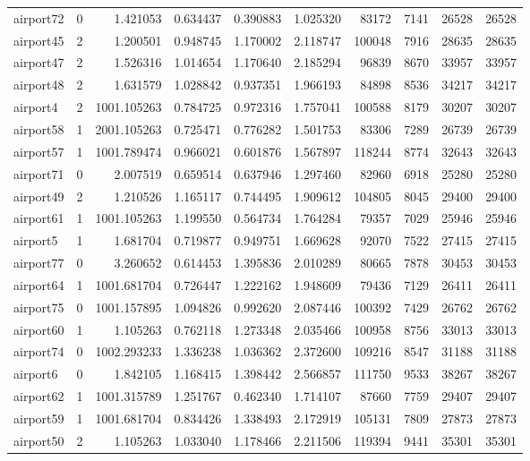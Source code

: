 \begin{longtable}{|l|r|r|r|r|r|r|r|r|r|}
airport72 & 0 & 1.421053 & 0.634437 & 0.390883 & 1.025320 & 83172 & 7141 & 26528 & 26528 \\
airport45 & 2 & 1.200501 & 0.948745 & 1.170002 & 2.118747 & 100048 & 7916 & 28635 & 28635 \\
airport47 & 2 & 1.526316 & 1.014654 & 1.170640 & 2.185294 & 96839 & 8670 & 33957 & 33957 \\
airport48 & 2 & 1.631579 & 1.028842 & 0.937351 & 1.966193 & 84898 & 8536 & 34217 & 34217 \\
airport4 & 2 & 1001.105263 & 0.784725 & 0.972316 & 1.757041 & 100588 & 8179 & 30207 & 30207 \\
airport58 & 1 & 2001.105263 & 0.725471 & 0.776282 & 1.501753 & 83306 & 7289 & 26739 & 26739 \\
airport57 & 1 & 1001.789474 & 0.966021 & 0.601876 & 1.567897 & 118244 & 8774 & 32643 & 32643 \\
airport71 & 0 & 2.007519 & 0.659514 & 0.637946 & 1.297460 & 82960 & 6918 & 25280 & 25280 \\
airport49 & 2 & 1.210526 & 1.165117 & 0.744495 & 1.909612 & 104805 & 8045 & 29400 & 29400 \\
airport61 & 1 & 1001.105263 & 1.199550 & 0.564734 & 1.764284 & 79357 & 7029 & 25946 & 25946 \\
airport5 & 1 & 1.681704 & 0.719877 & 0.949751 & 1.669628 & 92070 & 7522 & 27415 & 27415 \\
airport77 & 0 & 3.260652 & 0.614453 & 1.395836 & 2.010289 & 80665 & 7878 & 30453 & 30453 \\
airport64 & 1 & 1001.681704 & 0.726447 & 1.222162 & 1.948609 & 79436 & 7129 & 26411 & 26411 \\
airport75 & 0 & 1001.157895 & 1.094826 & 0.992620 & 2.087446 & 100392 & 7429 & 26762 & 26762 \\
airport60 & 1 & 1.105263 & 0.762118 & 1.273348 & 2.035466 & 100958 & 8756 & 33013 & 33013 \\
airport74 & 0 & 1002.293233 & 1.336238 & 1.036362 & 2.372600 & 109216 & 8547 & 31188 & 31188 \\
airport6 & 0 & 1.842105 & 1.168415 & 1.398442 & 2.566857 & 111750 & 9533 & 38267 & 38267 \\
airport62 & 1 & 1001.315789 & 1.251767 & 0.462340 & 1.714107 & 87660 & 7759 & 29407 & 29407 \\
airport59 & 1 & 1001.681704 & 0.834426 & 1.338493 & 2.172919 & 105131 & 7809 & 27873 & 27873 \\
airport50 & 2 & 1.105263 & 1.033040 & 1.178466 & 2.211506 & 119394 & 9441 & 35301 & 35301 \\

\end{longtable}
